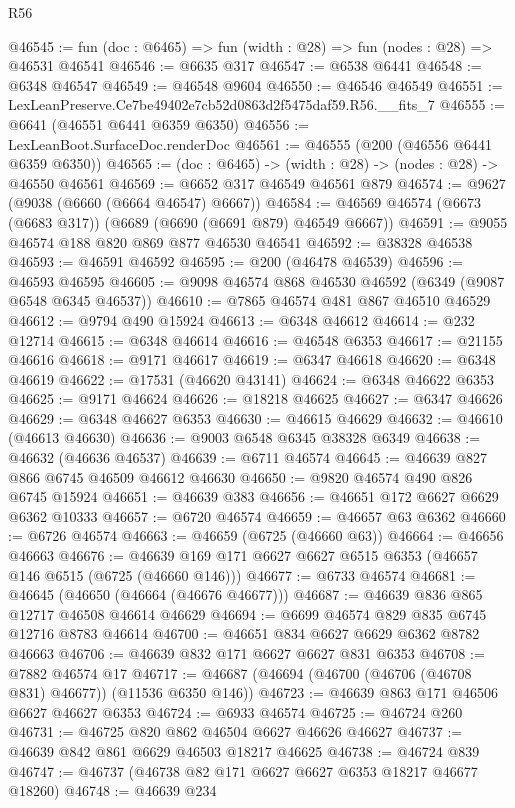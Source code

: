 \begin{lexlean}{R56}
\begin{coremodule}
@46545 := fun (doc : @6465) => fun (width : @28) => fun (nodes : @28) => @46531 @46541
@46546 := @6635 @317
@46547 := @6538 @6441
@46548 := @6348 @46547
@46549 := @46548 @9604
@46550 := @46546 @46549
@46551 := LexLeanPreserve.Ce7be49402e7cb52d0863d2f5475daf59.R56.__fits_7
@46555 := @6641 (@46551 @6441 @6359 @6350)
@46556 := LexLeanBoot.SurfaceDoc.renderDoc
@46561 := @46555 (@200 (@46556 @6441 @6359 @6350))
@46565 := (doc : @6465) -> (width : @28) -> (nodes : @28) -> @46550 @46561
@46569 := @6652 @317 @46549 @46561 @879
@46574 := @9627 (@9038 (@6660 (@6664 @46547) @6667))
@46584 := @46569 @46574 (@6673 (@6683 @317)) (@6689 (@6690 (@6691 @879) @46549 @6667))
@46591 := @9055 @46574 @188 @820 @869 @877 @46530 @46541
@46592 := @38328 @46538
@46593 := @46591 @46592
@46595 := @200 (@46478 @46539)
@46596 := @46593 @46595
@46605 := @9098 @46574 @868 @46530 @46592 (@6349 (@9087 @6548 @6345 @46537))
@46610 := @7865 @46574 @481 @867 @46510 @46529
@46612 := @9794 @490 @15924
@46613 := @6348 @46612
@46614 := @232 @12714
@46615 := @6348 @46614
@46616 := @46548 @6353
@46617 := @21155 @46616
@46618 := @9171 @46617
@46619 := @6347 @46618
@46620 := @6348 @46619
@46622 := @17531 (@46620 @43141)
@46624 := @6348 @46622 @6353
@46625 := @9171 @46624
@46626 := @18218 @46625
@46627 := @6347 @46626
@46629 := @6348 @46627 @6353
@46630 := @46615 @46629
@46632 := @46610 (@46613 @46630)
@46636 := @9003 @6548 @6345 @38328 @6349
@46638 := @46632 (@46636 @46537)
@46639 := @6711 @46574
@46645 := @46639 @827 @866 @6745 @46509 @46612 @46630
@46650 := @9820 @46574 @490 @826 @6745 @15924
@46651 := @46639 @383
@46656 := @46651 @172 @6627 @6629 @6362 @10333
@46657 := @6720 @46574
@46659 := @46657 @63 @6362
@46660 := @6726 @46574
@46663 := @46659 (@6725 (@46660 @63))
@46664 := @46656 @46663
@46676 := @46639 @169 @171 @6627 @6627 @6515 @6353 (@46657 @146 @6515 (@6725 (@46660 @146)))
@46677 := @6733 @46574
@46681 := @46645 (@46650 (@46664 (@46676 @46677)))
@46687 := @46639 @836 @865 @12717 @46508 @46614 @46629
@46694 := @6699 @46574 @829 @835 @6745 @12716 @8783 @46614
@46700 := @46651 @834 @6627 @6629 @6362 @8782 @46663
@46706 := @46639 @832 @171 @6627 @6627 @831 @6353
@46708 := @7882 @46574 @17
@46717 := @46687 (@46694 (@46700 (@46706 (@46708 @831) @46677)) (@11536 @6350 @146))
@46723 := @46639 @863 @171 @46506 @6627 @46627 @6353
@46724 := @6933 @46574
@46725 := @46724 @260
@46731 := @46725 @820 @862 @46504 @6627 @46626 @46627
@46737 := @46639 @842 @861 @6629 @46503 @18217 @46625
@46738 := @46724 @839
@46747 := @46737 (@46738 @82 @171 @6627 @6627 @6353 @18217 @46677 @18260)
@46748 := @46639 @234

\end{coremodule}
\end{lexlean}
